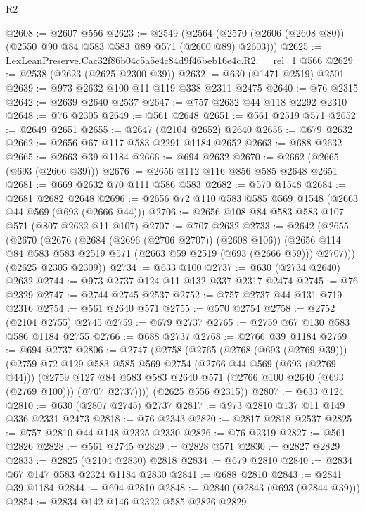 \begin{lexlean}{R2}
\begin{coremodule}
@2608 := @2607 @556
@2623 := @2549
    (@2564 (@2570 (@2606 (@2608 @80)) (@2550 @90 @84 @583 @583 @89 @571 (@2600 @89) @2603)))
@2625 := LexLeanPreserve.Cac32f86b04c5a5e4c84d9f46beb16e4c.R2.__rel_1 @566
@2629 := @2538 (@2623 (@2625 @2300 @39))
@2632 := @630 (@1471 @2519) @2501
@2639 := @973 @2632 @100 @11 @119 @338 @2311 @2475
@2640 := @76 @2315
@2642 := @2639 @2640 @2537
@2647 := @757 @2632 @44 @118 @2292 @2310
@2648 := @76 @2305
@2649 := @561 @2648
@2651 := @561 @2519 @571
@2652 := @2649 @2651
@2655 := @2647 (@2104 @2652) @2640
@2656 := @679 @2632
@2662 := @2656 @67 @117 @583 @2291 @1184 @2652
@2663 := @688 @2632
@2665 := @2663 @39 @1184
@2666 := @694 @2632
@2670 := @2662 (@2665 (@693 (@2666 @39)))
@2676 := @2656 @112 @116 @856 @585 @2648 @2651
@2681 := @669 @2632 @70 @111 @586 @583
@2682 := @570 @1548
@2684 := @2681 @2682 @2648
@2696 := @2656 @72 @110 @583 @585 @569 @1548 (@2663 @44 @569 (@693 (@2666 @44)))
@2706 := @2656 @108 @84 @583 @583 @107 @571 (@807 @2632 @11 @107)
@2707 := @707 @2632
@2733 := @2642
    (@2655
      (@2670
        (@2676
          (@2684 (@2696 (@2706 @2707)) (@2608 @106))
          (@2656 @114 @84 @583 @583 @2519 @571 (@2663 @59 @2519 (@693 (@2666 @59))) @2707)))
      (@2625 @2305 @2309))
@2734 := @633 @100
@2737 := @630 (@2734 @2640) @2632
@2744 := @973 @2737 @124 @11 @132 @337 @2317 @2474
@2745 := @76 @2329
@2747 := @2744 @2745 @2537
@2752 := @757 @2737 @44 @131 @719 @2316
@2754 := @561 @2640 @571
@2755 := @570 @2754
@2758 := @2752 (@2104 @2755) @2745
@2759 := @679 @2737
@2765 := @2759 @67 @130 @583 @586 @1184 @2755
@2766 := @688 @2737
@2768 := @2766 @39 @1184
@2769 := @694 @2737
@2806 := @2747
    (@2758
      (@2765
        (@2768 (@693 (@2769 @39)))
        (@2759
          @72
          @129
          @583
          @585
          @569
          @2754
          (@2766 @44 @569 (@693 (@2769 @44)))
          (@2759
            @127
            @84
            @583
            @583
            @2640
            @571
            (@2766 @100 @2640 (@693 (@2769 @100)))
            (@707 @2737))))
      (@2625 @556 @2315))
@2807 := @633 @124
@2810 := @630 (@2807 @2745) @2737
@2817 := @973 @2810 @137 @11 @149 @336 @2331 @2473
@2818 := @76 @2343
@2820 := @2817 @2818 @2537
@2825 := @757 @2810 @44 @148 @2325 @2330
@2826 := @76 @2319
@2827 := @561 @2826
@2828 := @561 @2745
@2829 := @2828 @571
@2830 := @2827 @2829
@2833 := @2825 (@2104 @2830) @2818
@2834 := @679 @2810
@2840 := @2834 @67 @147 @583 @2324 @1184 @2830
@2841 := @688 @2810
@2843 := @2841 @39 @1184
@2844 := @694 @2810
@2848 := @2840 (@2843 (@693 (@2844 @39)))
@2854 := @2834 @142 @146 @2322 @585 @2826 @2829

\end{coremodule}
\end{lexlean}
